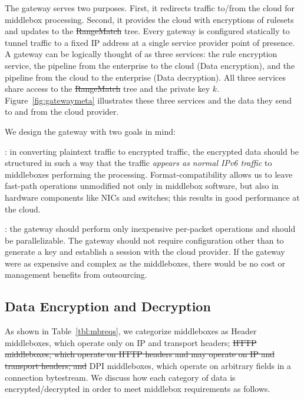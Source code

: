 \documentclass[letterpaper,twocolumn,10pt]{article}
\providecommand{\DIFaddtex}[1]{{\protect\color{blue}\uwave{#1}}} %
\providecommand{\DIFdeltex}[1]{{\protect\color{red}\sout{#1}}}                      %
\providecommand{\DIFaddbegin}{} %
\providecommand{\DIFaddend}{} %
\providecommand{\DIFdelbegin}{} %
\providecommand{\DIFdelend}{} %
\providecommand{\DIFadd}[1]{\texorpdfstring{\DIFaddtex{#1}}{#1}} %
\providecommand{\DIFdel}[1]{\texorpdfstring{\DIFdeltex{#1}}{}} %
\begin{document}
The gateway serves two purposes. First, it redirects traffic to/from the cloud for middlebox processing. Second, it provides the cloud with encryptions of rulesets and updates to the \DIFdelbegin \DIFdel{RangeMatch }\DIFdelend \DIFaddbegin \DIFadd{PrefixMatch }\DIFaddend tree.
Every gateway is configured statically to tunnel traffic to a fixed IP address at a single service provider point of presence.
A gateway can be logically thought of as three services: the rule encryption service, the pipeline from the enterprise to the cloud (Data encryption), and the pipeline from the cloud to the enterprise (Data decryption). 
All three services share access to the \DIFdelbegin \DIFdel{RangeMatch }\DIFdelend \DIFaddbegin \DIFadd{PrefixMatch }\DIFaddend tree and the private key $k$.
Figure~\ref{fig:gatewaymeta} illustrates  these three services and the data they send to and from the cloud provider.

We design the gateway with two goals in mind: 

: in converting plaintext traffic to encrypted traffic, the encrypted data should be structured in such a way that the traffic {\it appears as normal IPv6 traffic} to middleboxes performing the processing. Format-compatibility allows us to leave fast-path operations unmodified not only in middlebox software, but also in hardware components like NICs and switches; this results in good performance at the cloud.

: the gateway should perform only inexpensive per-packet operations and should be parallelizable. The gateway should not require configuration other than to generate a key and establish a session with the cloud provider. If the gateway were as expensive and complex as the middleboxes, there would be no cost or management benefits from outsourcing. 


\subsection{Data Encryption and Decryption}
\label{sec:dataenc}

As shown in Table~\ref{tbl:mbreqs}, we categorize middleboxes as Header middleboxes, which operate only on IP and transport headers; \DIFdelbegin \DIFdel{HTTP middleboxes, which operate on HTTP headers and may operate on IP and transport headers; and }\DIFdelend \DIFaddbegin \DIFadd{and }\DIFaddend DPI middleboxes, which operate on arbitrary fields in a connection bytestream. We discuss how each category of data is encrypted/decrypted in order to meet middlebox requirements as follows.
\end{document}
